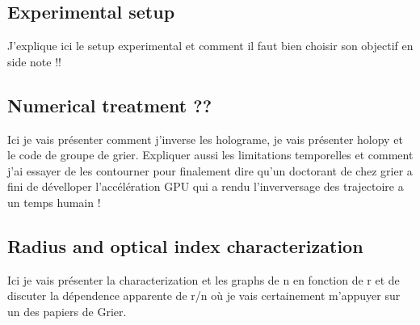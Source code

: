\subsection{Experimental setup}
J'explique ici le setup experimental et comment il faut bien choisir son objectif en side note !!

\subsection{Numerical treatment ??}

Ici je vais présenter comment j'inverse les holograme, je vais présenter holopy et le code de groupe de grier. Expliquer aussi les limitations temporelles et comment j'ai essayer de les contourner pour finalement dire qu'un doctorant de chez grier a fini de dévelloper l'accélération GPU qui a rendu l'inverversage des trajectoire a un temps humain !

\subsection{Radius and optical index characterization}


Ici je vais présenter la characterization et les graphs de n en fonction de r et de discuter la dépendence apparente de r/n où je vais certainement m'appuyer sur un des papiers de Grier. 


